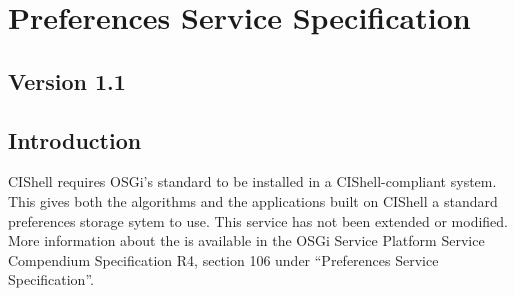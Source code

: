 \chapter{Preferences Service Specification}
\label{preferencesService}
\section*{Version 1.1}
\section{Introduction}

CIShell requires OSGi's standard  to be installed in a
CIShell-compliant system. This gives both the algorithms and the applications
built on CIShell a standard preferences storage sytem to use. This service has
not been extended or modified. More information about the
 is available in the OSGi Service Platform Service
Compendium Specification R4, section 106 under ``Preferences Service
Specification''.

